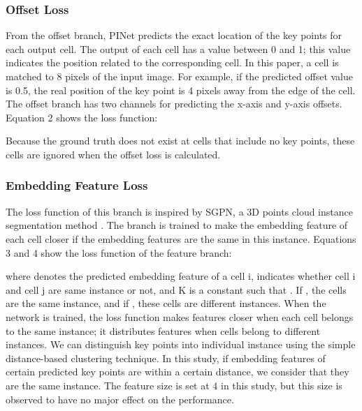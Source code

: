 \documentclass[journal]{IEEEtran}
\begin{document}
\subsubsection{Offset Loss}
From the offset branch, PINet predicts the exact location of the key points for each output cell. The output of each cell has a value between 0 and 1; this value indicates the position related to the corresponding cell. In this paper, a cell is matched to 8 pixels of the input image. For example, if the predicted offset value is 0.5, the real position of the key point is 4 pixels away from the edge of the cell. The offset branch has two channels for predicting the x-axis and y-axis offsets. Equation 2 shows the loss function:



Because the ground truth does not exist at cells that include no key points, these cells are ignored when the offset loss is calculated.

\subsubsection{Embedding Feature Loss}
The loss function of this branch is inspired by SGPN, a 3D points cloud instance segmentation method \cite{wang2018sgpn}. The branch is trained to make the embedding feature of each cell closer if the embedding features are the same in this instance. Equations 3 and 4 show the loss function of the feature branch:



where  denotes the predicted embedding feature of a cell i,  indicates whether cell i and cell j are same instance or not, and K is a constant such that . If , the cells are the same instance, and if , these cells are different instances. When the network is trained, the loss function makes features closer when each cell belongs to the same instance; it distributes features when cells belong to different instances. We can distinguish key points into individual instance using the simple distance-based clustering technique. In this study, if embedding features of certain predicted key points are within a certain distance, we consider that they are the same instance. The feature size is set at 4 in this study, but this size is observed to have no major effect on the performance.
\end{document}
